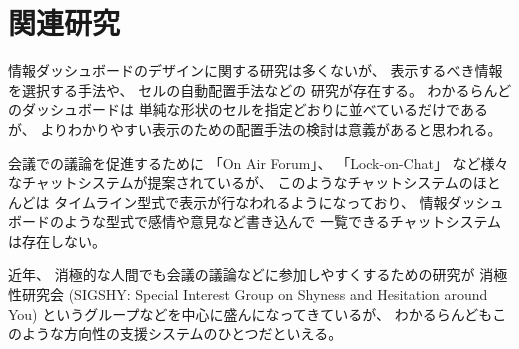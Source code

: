 \section{関連研究}

情報ダッシュボードのデザイン\cite{few}に関する研究は多くないが、
表示するべき情報を選択する手法\cite{Jones:2015:ECI:2800835.2800963}や、
セルの自動配置手法\cite{Hertzog:2015:BSP:2678025.2701383}などの
研究が存在する。
わかるらんどのダッシュボードは
単純な形状のセルを指定どおりに並べているだけであるが、
よりわかりやすい表示のための配置手法の検討は意義があると思われる。

会議での議論を促進するために
「On Air Forum」\cite{nishida2011}、
「Lock-on-Chat」\cite{nishida2006}
など様々なチャットシステムが提案されているが、
このようなチャットシステムのほとんどは
タイムライン型式で表示が行なわれるようになっており、
情報ダッシュボードのような型式で感情や意見など書き込んで
一覧できるチャットシステムは存在しない。

近年、
消極的な人間でも会議の議論などに参加しやすくするための研究が
消極性研究会 (SIGSHY: Special Interest Group on Shyness and Hesitation around You)
というグループなどを中心に盛んになってきているが\cite{kurihara2016}\cite{nishida2011}、
わかるらんどもこのような方向性の支援システムのひとつだといえる。

% 
% 
% 

